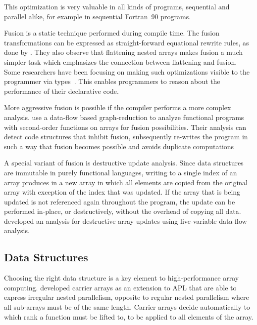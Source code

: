 \documentclass[a4paper]{article}
\begin{document}
This optimization is very valuable in all kinds of programs,
sequential and parallel alike, for example in sequential
Fortran~90 programs\cite{Hwang:1995:AOS:209936.209949}.

Fusion is a static technique performed during compile time. The fusion
transformations can be expressed as straight-forward equational
rewrite rules, as done by
\citet{Chakravarty:2001:FAF:507635.507661}. They also observe that
flattening nested arrays makes fusion a much simpler task which
emphasizes the connection between flattening and fusion. Some
researchers have been focusing on making such optimizations visible to
the programmer via
types~\cite{Lippmeier:2012:GPA:2364506.2364511}. This enables
programmers to reason about the performance of their declarative code.

More aggressive fusion is possible if the compiler performs a more
complex analysis. \citet{Henriksen:2013:TGA:2502323.2502328} use a
data-flow based graph-reduction to analyze functional programs with
second-order functions on arrays for fusion possibilities. Their
analysis can detect code structures that inhibit fusion, subsequently
re-writes the program in such a way that fusion becomes possible and
avoids duplicate computations

A special variant of fusion is destructive update analysis. Since data
structures are immutable in purely functional languages, writing to a
single index of an array produces in a new array in which all elements
are copied from the original array with exception of the index that
was updated. If the array that is being updated is not referenced
again throughout the program, the update can be performed in-place, or
destructively, without the overhead of copying all
data. \citet{Sastry:1994:PDU:182409.182486} developed an analysis for
destructive array updates using live-variable data-flow analysis.

\subsection{Data Structures}
\label{sec:data-structures}

Choosing the right data structure is a key element to high-performance
array computing. \citet{Lowney:1981:CAI:567532.567533} developed
carrier arrays as an extension to APL that are able to express
irregular nested parallelism, opposite to regular nested parallelism
where all sub-arrays must be of the same length. Carrier arrays decide
automatically to which rank a function must be lifted to, to be
applied to all elements of the array.
\end{document}
